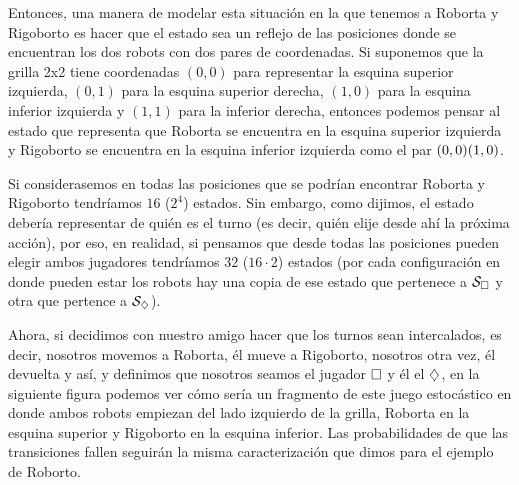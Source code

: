 Entonces, una manera de modelar esta situación en la que tenemos a Roborta y
Rigoborto es hacer que el estado sea un reflejo de las posiciones donde se
encuentran los dos robots con dos pares de coordenadas. Si suponemos que la
grilla 2x2 tiene coordenadas $(0,0)$ para representar la esquina superior
izquierda, $(0,1)$ para la esquina superior derecha, $(1,0)$ para la esquina
inferior izquierda y $(1,1)$ para la inferior derecha, entonces podemos pensar
al estado que representa que Roborta se encuentra en la esquina superior
izquierda y Rigoborto se encuentra en la esquina inferior izquierda como el par
$(0,0) \\ (1,0)$.

Si considerasemos en todas las posiciones que se podrían encontrar Roborta y
Rigoborto tendríamos $16$ ($2^4$) estados. Sin embargo, como dijimos, el estado
debería representar de quién es el turno (es decir, quién elije desde ahí la
próxima acción), por eso, en realidad, si pensamos que desde todas las
posiciones pueden elegir ambos jugadores tendríamos $32$ ($16 \cdot 2$) estados
(por cada configuración en donde pueden estar los robots hay una copia de ese
estado que pertenece a $\mathcal{S}_\square$ y otra que pertence a $\mathcal{S}_\diamondsuit$).

Ahora, si decidimos con nuestro amigo hacer que los turnos sean intercalados,
es decir, nosotros movemos a Roborta, él mueve a Rigoborto, nosotros otra vez,
él devuelta y así, y definimos que nosotros seamos el jugador $\square$ y él el
$\diamondsuit$, en la siguiente figura podemos ver cómo sería un fragmento de este
juego estocástico en donde ambos robots empiezan del lado izquierdo de la
grilla, Roborta en la esquina superior y Rigoborto en la esquina inferior. Las
probabilidades de que las transiciones fallen seguirán la misma caracterización
que dimos para el ejemplo de Roborto.

